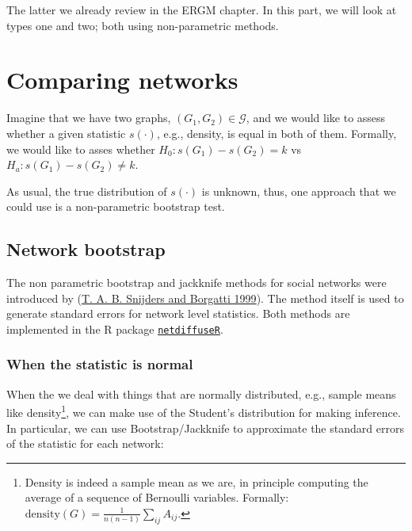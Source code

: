 \documentclass[
]{book}
\begin{document}
The latter we already review in the ERGM chapter. In this part, we will look
at types one and two; both using non-parametric methods.

\hypertarget{comparing-networks}{%
\section{Comparing networks}\label{comparing-networks}}

Imagine that we have two graphs, \((G_1,G_2) \in \mathcal{G}\), and we would like
to assess whether a given statistic \(s(\cdot)\), e.g., density, is equal in both of them.
Formally, we would like to asses whether \(H_0: s(G_1) - s(G_2) = k\) vs
\(H_a: s(G_1) - s(G_2) \neq k\).

As usual, the true distribution of \(s(\cdot)\) is unknown, thus, one approach that
we could use is a non-parametric bootstrap test.

\hypertarget{network-bootstrap}{%
\subsection{Network bootstrap}\label{network-bootstrap}}

The non parametric bootstrap and jackknife methods for social networks were
introduced by (\protect\hyperlink{ref-Snijders1999}{T. A. B. Snijders and Borgatti 1999}). The method itself is used to generate standard
errors for network level statistics. Both methods are implemented in the R
package \href{https://cran.r-project.org/package=netdiffuseR}{\texttt{netdiffuseR}}.

\hypertarget{when-the-statistic-is-normal}{%
\subsubsection{When the statistic is normal}\label{when-the-statistic-is-normal}}

When the we deal with things that are normally distributed, e.g., sample means
like density\footnote{Density is indeed a sample mean as we are, in principle
  computing the average of a sequence of Bernoulli variables. Formally:
  \(\mbox{density}(G) = \frac{1}{n(n-1)}\sum_{ij}A_{ij}\).},
we can make use of the Student's distribution for making inference. In particular,
we can use Bootstrap/Jackknife to approximate the standard errors of the statistic
for each network:
\end{document}

